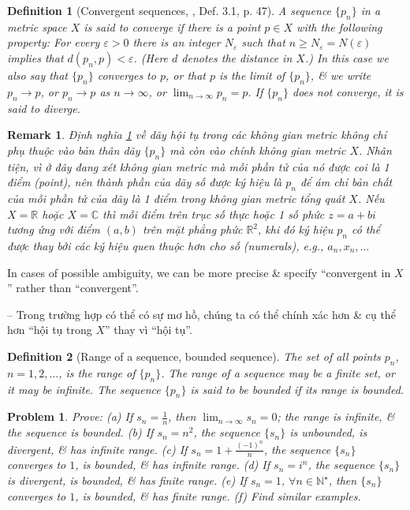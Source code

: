 \documentclass[oneside]{book}
\newtheorem{definition}{Definition}
\newtheorem{problem}{Problem}
\newtheorem{remark}{Remark}
\begin{document}
\begin{definition}[Convergent sequences, \cite{Rudin1976}, Def. 3.1, p. 47]
	\label{def: convergent sequence in metric space}
	A sequence $\{p_n\}$ in a metric space $X$ is said to {\rm converge} if there is a point $p\in X$ with the following property: For every $\varepsilon > 0$ there is an integer $N_\varepsilon$ such that $n\ge N_\varepsilon = N(\varepsilon)$ implies that $d(p_n,p) < \varepsilon$. (Here $d$ denotes the {\rm distance} in $X$.) In this case we also say that $\{p_n\}$ converges to $p$, or that $p$ is the {\rm limit} of $\{p_n\}$, \& we write $p_n\to p$, or $p_n\to p$ as $n\to\infty$, or $\lim_{n\to\infty} p_n = p$. If $\{p_n\}$ does not converge, it is said to {\rm diverge}.
\end{definition}

\begin{remark}
	Định nghĩa \ref{def: convergent sequence in metric space} về dãy hội tụ trong các không gian metric không chỉ phụ thuộc vào bản thân dãy $\{p_n\}$ mà còn vào chính không gian metric $X$. Nhân tiện, vì ở đây đang xét không gian metric mà mỗi phần tử của nó được coi là 1 điểm (point), nên thành phần của dãy số được ký hiệu là $p_n$ để ám chỉ bản chất của mỗi phần tử của dãy là 1 điểm trong không gian metric tổng quát $X$. Nếu $X = \mathbb{R}$ hoặc $X = \mathbb{C}$ thì mỗi điểm trên trục số thực hoặc 1 số phức $z = a + bi$ tương ứng với điểm $(a,b)$ trên mặt phẳng phức $\mathbb{R}^2$, khi đó ký hiệu $p_n$ có thể được thay bởi các ký hiệu quen thuộc hơn cho số (numerals), e.g., $a_n,x_n,\ldots$
\end{remark}
In cases of possible ambiguity, we can be more precise \& specify ``convergent in $X$'' rather than ``convergent''.

-- Trong trường hợp có thể có sự mơ hồ, chúng ta có thể chính xác hơn \& cụ thể hơn ``hội tụ trong $X$'' thay vì ``hội tụ''.

\begin{definition}[Range of a sequence, bounded sequence]
	The set of all points $p_n$, $n = 1,2,\ldots$, is the {\rm range} of $\{p_n\}$. The range of a sequence may be a finite set, or it may be infinite. The sequence $\{p_n\}$ is said to be {\rm bounded} if its range is bounded.
\end{definition}

\begin{problem}
	Prove: (a) If $s_n = \frac{1}{n}$, then $\lim_{n\to\infty} s_n = 0$; the range is infinite, \& the sequence is bounded. (b) If $s_n = n^2$, the sequence $\{s_n\}$ is unbounded, is divergent, \& has infinite range. (c) If $s_n = 1 + \frac{(-1)^n}{n}$, the sequence $\{s_n\}$ converges to $1$, is bounded, \& has infinite range. (d) If $s_n = i^n$, the sequence $\{s_n\}$ is divergent, is bounded, \& has finite range. (e) If $s_n = 1$, $\forall n\in\mathbb{N}^\star$, then $\{s_n\}$ converges to $1$, is bounded, \& has finite range. (f) Find similar examples.
\end{problem}
\end{document}
